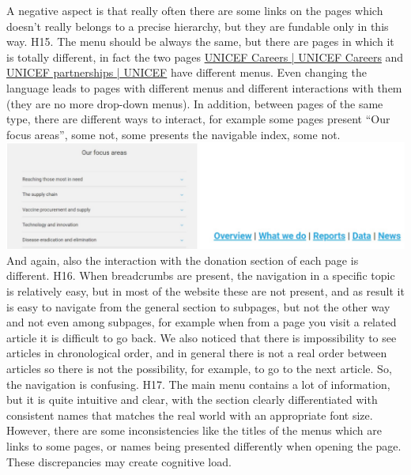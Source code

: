 \newline A negative aspect is that really often there are some links on the pages which doesn’t really belongs to a precise hierarchy, but they are fundable only in this way.
\newline
\newline H15.	The menu should be always the same, but there are pages in which it is totally different, in fact the two pages \href{https://www.unicef.org/careers/}{UNICEF Careers | UNICEF Careers} and \href{https://www.unicef.org/partnerships}{UNICEF partnerships | UNICEF} have different menus. Even changing the language leads to pages with different menus and different interactions with them (they are no more drop-down menus).
\newline In addition, between pages of the same type, there are different ways to interact, for example  some pages present “Our focus areas”, some not, some presents the navigable index, some not.
\newline \includegraphics[width=\textwidth]{FinalScores19.jpg}
\newline And again, also the interaction with the donation section of each page is different.
\newline
\newline H16.	When breadcrumbs are present, the navigation in a specific topic is relatively easy, but in most of the website these are not present, and as result it is easy to navigate from the general section to subpages, but not the other way and not even among subpages, for example when from a page you visit a related article it is difficult to go back.
\newline We also noticed that there is impossibility to see articles in chronological order, and in general there is not a real order between articles so there is not the possibility, for example, to go to the next article.
\newline So, the navigation is confusing.
\newline
\newline H17.	The main menu contains a lot of information, but it is quite intuitive and clear, with the section clearly differentiated with consistent names that matches the real world with an appropriate font size. However, there are some inconsistencies like the titles of the menus which are links to some pages, or names being presented differently when opening the page. These discrepancies may create cognitive load. 
